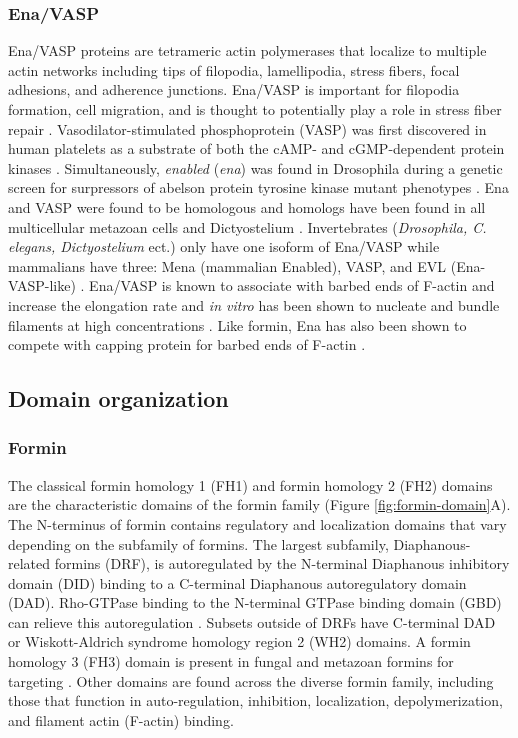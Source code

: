 \subsubsection{Ena/VASP}
	Ena/VASP proteins are tetrameric actin polymerases that localize to multiple actin networks including tips of filopodia, lamellipodia, stress fibers, focal adhesions, and adherence junctions. Ena/VASP is important for filopodia formation, cell migration, and is thought to potentially play a role in stress fiber repair \cite{kwiatkowski_function_2003}. Vasodilator-stimulated phosphoprotein (VASP) was first discovered in human platelets as a substrate of both the cAMP- and cGMP-dependent protein kinases \citep{halbrugge_analysis_1990}. Simultaneously, \textit{enabled} (\textit{ena}) was found in Drosophila during a genetic screen for surpressors of abelson protein tyrosine kinase mutant phenotypes \citep{gertler_genetic_1990}. Ena and VASP were found to be homologous \citep{ahern-djamali_identification_1999} and homologs have been found in all multicellular metazoan cells and Dictyostelium \citep{sebe-pedros_insights_2013}. Invertebrates (\textit{Drosophila, C. elegans, Dictyostelium} ect.) only have one isoform of Ena/VASP while mammalians have three: Mena (mammalian Enabled), VASP, and EVL (Ena-VASP-like) \cite{gertler_mena_1996}. Ena/VASP is known to associate with barbed ends of F-actin and increase the elongation rate and \textit{in vitro} has been shown to nucleate and bundle filaments at high concentrations \citep{breitsprecher_clustering_2008,breitsprecher_molecular_2011,winkelman_ena/vasp_2014,hansen_vasp_2010,pasic_ena/vasp_2008,bear_ena/vasp:_2009}.
Like formin, Ena has also been shown to compete with capping protein for barbed ends of F-actin \citep{bear_ena/vasp:_2009}. 

\subsection{Domain organization}\label{ena-formin-domains}

\subsubsection{Formin}
The classical formin homology 1 (FH1) and formin homology 2 (FH2) domains are the characteristic  domains of the formin family (Figure \ref{fig:formin-domain}A). The N-terminus of formin contains regulatory and localization domains that vary depending on the subfamily of formins. The largest subfamily, Diaphanous-related formins (DRF), is autoregulated by the N-terminal Diaphanous inhibitory domain (DID) binding to a C-terminal Diaphanous autoregulatory domain (DAD).  Rho-GTPase binding to the N-terminal GTPase binding domain (GBD) can relieve this autoregulation \citep{higgs_formin_2005}. Subsets outside of DRFs have C-terminal DAD or Wiskott-Aldrich syndrome homology region 2 (WH2) domains. A formin homology 3 (FH3) domain is present in fungal and metazoan formins for targeting \citep{petersen_fh3_1998}. Other domains are found across the diverse formin family, including those that function in auto-regulation, inhibition, localization, depolymerization, and filament actin (F-actin) binding.

